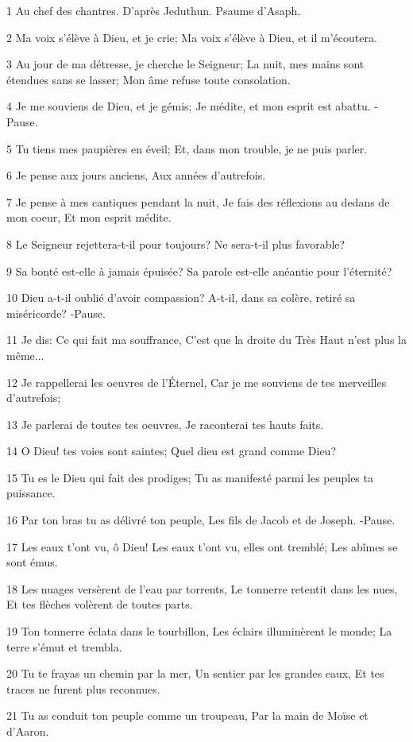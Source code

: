 \par 1 Au chef des chantres. D'après Jeduthun. Psaume d'Asaph.
\par 2 Ma voix s'élève à Dieu, et je crie; Ma voix s'élève à Dieu, et il m'écoutera.
\par 3 Au jour de ma détresse, je cherche le Seigneur; La nuit, mes mains sont étendues sans se lasser; Mon âme refuse toute consolation.
\par 4 Je me souviens de Dieu, et je gémis; Je médite, et mon esprit est abattu. -Pause.
\par 5 Tu tiens mes paupières en éveil; Et, dans mon trouble, je ne puis parler.
\par 6 Je pense aux jours anciens, Aux années d'autrefois.
\par 7 Je pense à mes cantiques pendant la nuit, Je fais des réflexions au dedans de mon coeur, Et mon esprit médite.
\par 8 Le Seigneur rejettera-t-il pour toujours? Ne sera-t-il plus favorable?
\par 9 Sa bonté est-elle à jamais épuisée? Sa parole est-elle anéantie pour l'éternité?
\par 10 Dieu a-t-il oublié d'avoir compassion? A-t-il, dans sa colère, retiré sa miséricorde? -Pause.
\par 11 Je dis: Ce qui fait ma souffrance, C'est que la droite du Très Haut n'est plus la même...
\par 12 Je rappellerai les oeuvres de l'Éternel, Car je me souviens de tes merveilles d'autrefois;
\par 13 Je parlerai de toutes tes oeuvres, Je raconterai tes hauts faits.
\par 14 O Dieu! tes voies sont saintes; Quel dieu est grand comme Dieu?
\par 15 Tu es le Dieu qui fait des prodiges; Tu as manifesté parmi les peuples ta puissance.
\par 16 Par ton bras tu as délivré ton peuple, Les fils de Jacob et de Joseph. -Pause.
\par 17 Les eaux t'ont vu, ô Dieu! Les eaux t'ont vu, elles ont tremblé; Les abîmes se sont émus.
\par 18 Les nuages versèrent de l'eau par torrents, Le tonnerre retentit dans les nues, Et tes flèches volèrent de toutes parts.
\par 19 Ton tonnerre éclata dans le tourbillon, Les éclairs illuminèrent le monde; La terre s'émut et trembla.
\par 20 Tu te frayas un chemin par la mer, Un sentier par les grandes eaux, Et tes traces ne furent plus reconnues.
\par 21 Tu as conduit ton peuple comme un troupeau, Par la main de Moïse et d'Aaron.


